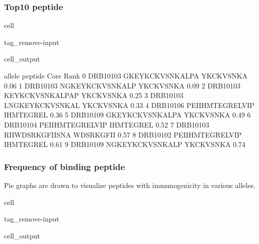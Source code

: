 \documentclass[letterpaper,10pt,english]{jupyterBook}
\begin{document}
\subsubsection{Top10 peptide}
\label{\detokenize{ipynb/chapter4:top10-peptide}}
\begin{sphinxuseclass}{cell}
\begin{sphinxuseclass}{tag_remove-input}\begin{sphinxVerbatimOutput}

\begin{sphinxuseclass}{cell_output}
\begin{sphinxVerbatim}[commandchars=\\\{\}]
      allele          peptide       Core  Rank
0  DRB1\PYGZus{}0103  GKEYKCKVSNKALPA  YKCKVSNKA  0.06
1  DRB1\PYGZus{}0103  NGKEYKCKVSNKALP  YKCKVSNKA  0.09
2  DRB1\PYGZus{}0103  KEYKCKVSNKALPAP  YKCKVSNKA  0.25
3  DRB1\PYGZus{}0103  LNGKEYKCKVSNKAL  YKCKVSNKA  0.33
4  DRB1\PYGZus{}0106  PEIIHMTEGRELVIP  IHMTEGREL  0.36
5  DRB1\PYGZus{}0109  GKEYKCKVSNKALPA  YKCKVSNKA  0.49
6  DRB1\PYGZus{}0104  PEIIHMTEGRELVIP  IHMTEGREL  0.52
7  DRB1\PYGZus{}0103  RIIWDSRKGFIISNA  WDSRKGFII  0.57
8  DRB1\PYGZus{}0102  PEIIHMTEGRELVIP  IHMTEGREL  0.61
9  DRB1\PYGZus{}0109  NGKEYKCKVSNKALP  YKCKVSNKA  0.74
\end{sphinxVerbatim}

\end{sphinxuseclass}\end{sphinxVerbatimOutput}

\end{sphinxuseclass}
\end{sphinxuseclass}

\subsubsection{Frequency of binding peptide}
\label{\detokenize{ipynb/chapter4:id2}}
\sphinxAtStartPar
Pie graphs are drawn to visualize peptides with immunogenicity in various alleles.

\begin{sphinxuseclass}{cell}
\begin{sphinxuseclass}{tag_remove-input}\begin{sphinxVerbatimOutput}

\begin{sphinxuseclass}{cell_output}
\noindent{}

\end{sphinxuseclass}\end{sphinxVerbatimOutput}

\end{sphinxuseclass}
\end{sphinxuseclass}
\end{document}
